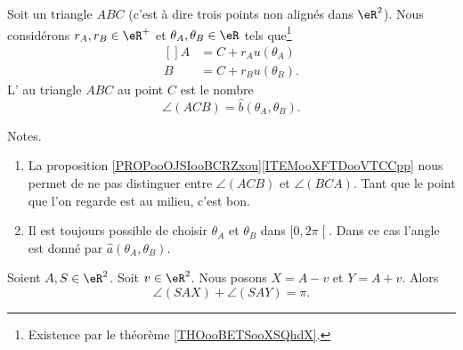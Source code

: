 \begin{definition}	\label{DEFooRDYHooLdPcDZ}
	Soit un triangle \( ABC\) (c'est à dire trois points non alignés dans \( \eR^2\)). Nous considérons \( r_A,r_B\in \eR^+\) et \( \theta_A,\theta_B\in \eR\) tels que\footnote{Existence par le théorème \ref{THOooBETSooXSQhdX}.}
	\begin{equation}
		\begin{aligned}[]
			A & =C+r_Au(\theta_A)  \\
			B & =C+r_Bu(\theta_B).
		\end{aligned}
	\end{equation}
	L' au triangle \( ABC\) au point \( C\) est le nombre
	\begin{equation}
		\angle(ACB)=\hat b(\theta_A,\theta_B).
	\end{equation}
\end{definition}


\begin{normaltext}
	Notes.
	\begin{enumerate}
		\item
		      La proposition \ref{PROPooOJSIooBCRZxou}\ref{ITEMooXFTDooVTCCpp} nous permet de ne pas distinguer entre \( \angle(ACB)\) et \( \angle(BCA)\). Tant que le point que l'on regarde est au milieu, c'est bon.
		\item
		      Il est toujours possible de choisir \( \theta_A\) et \( \theta_B\) dans \( \mathopen[ 0,2\pi\mathclose[\). Dans ce cas l'angle est donné par \( \hat a(\theta_A,\theta_B)\).
	\end{enumerate}
\end{normaltext}


\begin{proposition}	\label{PROPooTPZPooWFITqR}
	Soient \( A,S\in \eR^2\). Soit \( v\in \eR^2\). Nous posons \( X=A-v\) et \( Y=A+v\). Alors
	\begin{equation}
		\angle(SAX)+\angle(SAY)=\pi.
	\end{equation}
\end{proposition}

